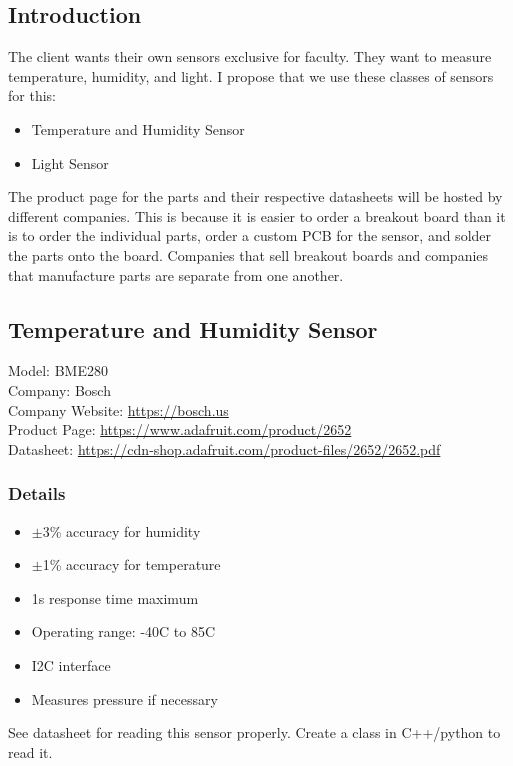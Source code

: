 \subsection{Introduction}
The client wants their own sensors exclusive for faculty. They want to measure temperature, humidity, and light. I propose that we use these classes of sensors for this:\\
\begin{itemize}
	\item Temperature and Humidity Sensor
	\item Light Sensor
\end{itemize}
The product page for the parts and their respective datasheets will be hosted by different companies. This is because it is easier to order a breakout board than it is to order the individual parts, order a custom PCB for the sensor, and solder the parts onto the board. Companies that sell breakout boards and companies that manufacture parts are separate from one another.

\subsection{Temperature and Humidity Sensor}
Model: BME280 \\
Company: Bosch \\
Company Website: \href{https://bosch.us/}{https://bosch.us} \\
Product Page: \href{https://www.adafruit.com/product/2652}{https://www.adafruit.com/product/2652} \\
Datasheet: \href{https://cdn-shop.adafruit.com/product-files/2652/2652.pdf}{https://cdn-shop.adafruit.com/product-files/2652/2652.pdf}

\subsubsection{Details}
\begin{itemize}
	\item $ \pm $3\% accuracy for humidity
	\item $ \pm $1\% accuracy for temperature
	\item 1s response time maximum
	\item Operating range: -40C to 85C
	\item I2C interface
	\item Measures pressure if necessary
\end{itemize}

See datasheet for reading this sensor properly. Create a class in C++/python to read it.

